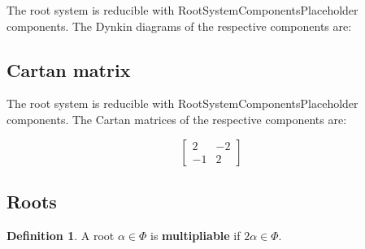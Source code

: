 \documentclass[11pt]{article}
\newcommand{\tbf}{\textbf}
\theoremstyle{definition}
\newtheorem{definition}{Definition}[section]
\newif\ifrootsystemirreducible
\begin{document}
\ifrootsystemirreducible
The root system is irreducible and has Dynkin diagram:
\else
The root system is reducible with RootSystemComponentsPlaceholder components. The Dynkin diagrams of the respective components are:
\fi

\begin{center}
\end{center}

\subsection{Cartan matrix}

\ifrootsystemirreducible
The root system is irreducible and has Cartan matrix:
\else
The root system is reducible with RootSystemComponentsPlaceholder components. The Cartan matrices of the respective components are:
\fi

\[
\left[\begin{matrix}2 & -2\\-1 & 2\end{matrix}\right]
\]

\subsection{Roots}

\begin{definition}
A root $\alpha \in \Phi$ is \tbf{multipliable} if $2\alpha \in \Phi$.
\end{definition}
\end{document}
